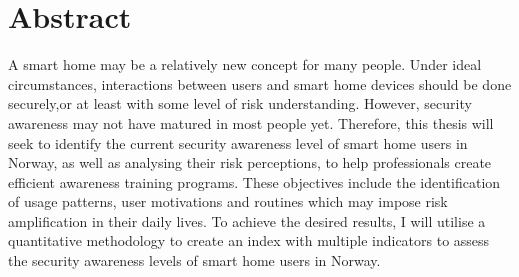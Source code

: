 \chapter*{Abstract}
A smart home may be a relatively new concept for many people. Under ideal circumstances, interactions between users and smart home devices should be done securely,or at least with some level of risk understanding. However, security awareness may not have matured in most people yet. Therefore, this thesis will seek to identify the current security awareness level of smart home users in Norway, as well as analysing their risk perceptions, to help professionals create efficient awareness training programs. These objectives include the identification of usage patterns, user motivations and routines which may impose risk amplification in their daily lives. To achieve the desired results, I will utilise a quantitative methodology to create an index with multiple indicators to assess the security awareness levels of smart home users in Norway.

\begin{comment}
The \texttt{ntnuthesis} document class is a customised version of the standard \LaTeX{} \texttt{report} document class. It can be used for theses at all levels – bachelor, master and PhD – and is available in English (British and American) and Norwegian (Bokmål and Nynorsk). This document is ment to serve (i) as a description of the document class, (ii) as an example of how to use it, and (iii) as a thesis template.
\end{comment}
